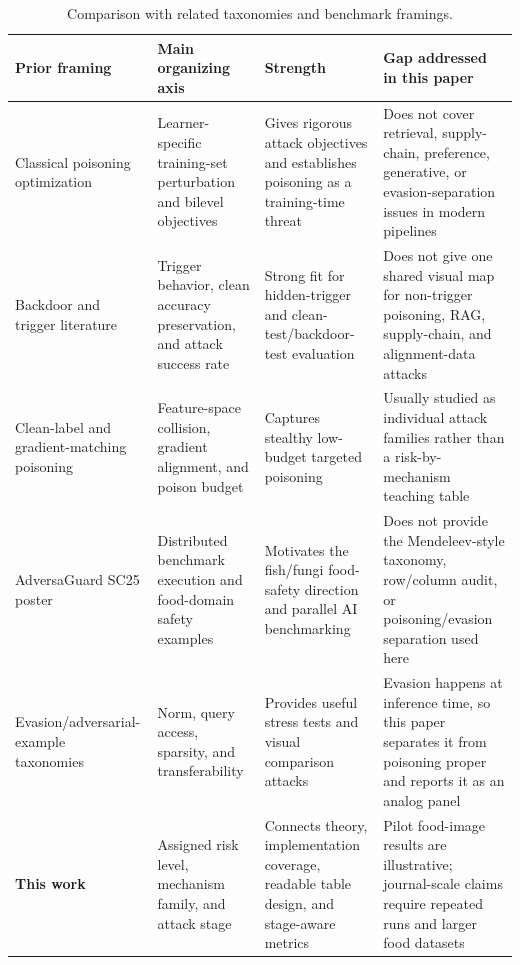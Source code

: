 ﻿\documentclass[6p,10pt,times]{ieeeaccess}
\begin{document}
\begin{table}[t]
\centering
\caption{Comparison with related taxonomies and benchmark framings.}
\label{tab:taxcomparison}
\small
\begin{tabular}{p{}p{}p{}p{}}
\toprule
Prior framing & Main organizing axis & Strength & Gap addressed in this paper \\
\midrule
Classical poisoning optimization~\cite{biggio2012,mei2015} & Learner-specific training-set perturbation and bilevel objectives & Gives rigorous attack objectives and establishes poisoning as a training-time threat & Does not cover retrieval, supply-chain, preference, generative, or evasion-separation issues in modern pipelines \\
Backdoor and trigger literature~\cite{badnets,targetedbackdoor} & Trigger behavior, clean accuracy preservation, and attack success rate & Strong fit for hidden-trigger and clean-test/backdoor-test evaluation & Does not give one shared visual map for non-trigger poisoning, RAG, supply-chain, and alignment-data attacks \\
Clean-label and gradient-matching poisoning~\cite{poisonfrogs,witchesbrew} & Feature-space collision, gradient alignment, and poison budget & Captures stealthy low-budget targeted poisoning & Usually studied as individual attack families rather than a risk-by-mechanism teaching table \\
AdversaGuard SC25 poster~\cite{adversaguard} & Distributed benchmark execution and food-domain safety examples & Motivates the fish/fungi food-safety direction and parallel AI benchmarking & Does not provide the Mendeleev-style taxonomy, row/column audit, or poisoning/evasion separation used here \\
Evasion/adversarial-example taxonomies~\cite{deepfool,cw,hopskipjump} & Norm, query access, sparsity, and transferability & Provides useful stress tests and visual comparison attacks & Evasion happens at inference time, so this paper separates it from poisoning proper and reports it as an analog panel \\
\textbf{This work} & Assigned risk level, mechanism family, and attack stage & Connects theory, implementation coverage, readable table design, and stage-aware metrics & Pilot food-image results are illustrative; journal-scale claims require repeated runs and larger food datasets \\
\bottomrule
\end{tabular}
\end{table}
\end{document}
